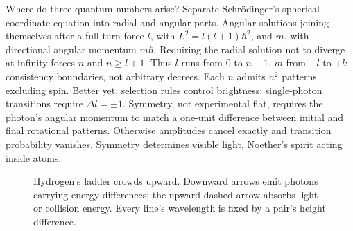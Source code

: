 \begin{challenge}
Where do three quantum numbers arise? Separate Schrödinger's spherical-coordinate equation into radial and angular parts. Angular solutions joining themselves after a full turn force \(l\), with \(L^2=l(l+1)\hbar^2\), and \(m\), with directional angular momentum \(m\hbar\). Requiring the radial solution not to diverge at infinity forces \(n\) and \(n\ge l+1\). Thus \(l\) runs from 0 to \(n-1\), \(m\) from \(-l\) to \(+l\): consistency boundaries, not arbitrary decrees. Each \(n\) admits \(n^2\) patterns excluding spin. Better yet, selection rules control brightness: single-photon transitions require \(\Delta l=\pm1\). Symmetry, not experimental fiat, requires the photon's angular momentum to match a one-unit difference between initial and final rotational patterns. Otherwise amplitudes cancel exactly and transition probability vanishes. Symmetry determines visible light, Noether's spirit acting inside atoms.
\end{challenge}

\begin{figure}[htbp]
\centering
{}
\caption{Hydrogen's ladder crowds upward. Downward arrows emit photons carrying energy differences; the upward dashed arrow absorbs light or collision energy. Every line's wavelength is fixed by a pair's height difference.}
\end{figure}

